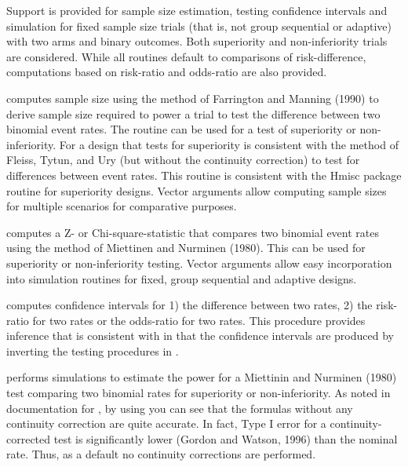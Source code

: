 \begin{Description}\relax
Support is provided for sample size estimation, testing confidence intervals and simulation for fixed sample size trials 
(that is, not group sequential or adaptive) with two arms and binary outcomes. 
Both superiority and non-inferiority trials are considered.
While all routines default to comparisons of risk-difference, 
computations based on risk-ratio and odds-ratio are also provided. 

 computes sample size using the method of Farrington and 
Manning (1990) to derive sample size required to power a trial to test the difference between two binomial event rates. 
The routine can be used for a test of superiority or non-inferiority.
For a design that tests for superiority  is consistent with the method of Fleiss, Tytun, and Ury 
(but without the continuity correction) to test for differences between event rates.
This routine is consistent with the Hmisc package routine  for superiority designs.
Vector arguments allow computing sample sizes for multiple scenarios for comparative purposes.

 computes a Z- or Chi-square-statistic that compares two binomial event rates using 
the method of Miettinen and Nurminen (1980). This can be used for superiority or non-inferiority testing.
Vector arguments allow easy incorporation into simulation routines for fixed, group sequential and adaptive designs.

 computes confidence intervals for 1) the difference between two rates, 2) the risk-ratio for two rates 
or the odds-ratio for two rates. This procedure provides inference that is consistent with  in that 
the confidence intervals are produced by inverting the testing procedures in .

 performs simulations to estimate the power for a Miettinin and Nurminen (1980) test
comparing two binomial rates for superiority or non-inferiority. 
As noted in documentation for , by using  you can see that the formulas 
without any continuity correction are quite accurate. 
In fact, Type I error for a continuity-corrected test is significantly lower (Gordon and Watson, 1996)
than the nominal rate. 
Thus, as a default no continuity corrections are performed.
\end{Description}
